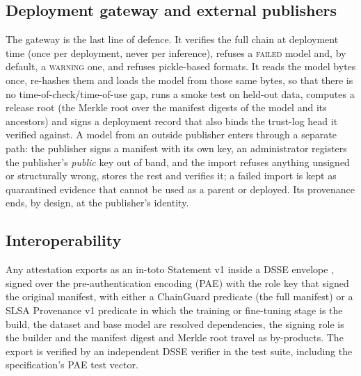 \documentclass[conference]{IEEEtran}
\newcommand{\st}[1]{\textsc{#1}}
\begin{document}
\subsection{Deployment gateway and external publishers}
The gateway is the last line of defence. It verifies the full chain at deployment time (once per deployment, never per inference), refuses a \st{failed} model and, by default, a \st{warning} one, and refuses pickle-based formats. It reads the model bytes once, re-hashes them and loads the model from those same bytes, so that there is no time-of-check/time-of-use gap, runs a smoke test on held-out data, computes a release root (the Merkle root over the manifest digests of the model and its ancestors) and signs a deployment record that also binds the trust-log head it verified against. A model from an outside publisher enters through a separate path: the publisher signs a manifest with its own key, an administrator registers the publisher's \emph{public} key out of band, and the import refuses anything unsigned or structurally wrong, stores the rest and verifies it; a failed import is kept as quarantined evidence that cannot be used as a parent or deployed. Its provenance ends, by design, at the publisher's identity.

\subsection{Interoperability}
Any attestation exports as an in-toto Statement v1 inside a DSSE envelope \cite{intotoattest,dsse}, signed over the pre-authentication encoding (PAE) with the role key that signed the original manifest, with either a ChainGuard predicate (the full manifest) or a SLSA Provenance v1 predicate \cite{slsa11} in which the training or fine-tuning stage is the build, the dataset and base model are resolved dependencies, the signing role is the builder and the manifest digest and Merkle root travel as by-products. The export is verified by an independent DSSE verifier in the test suite, including the specification's PAE test vector.
\end{document}
